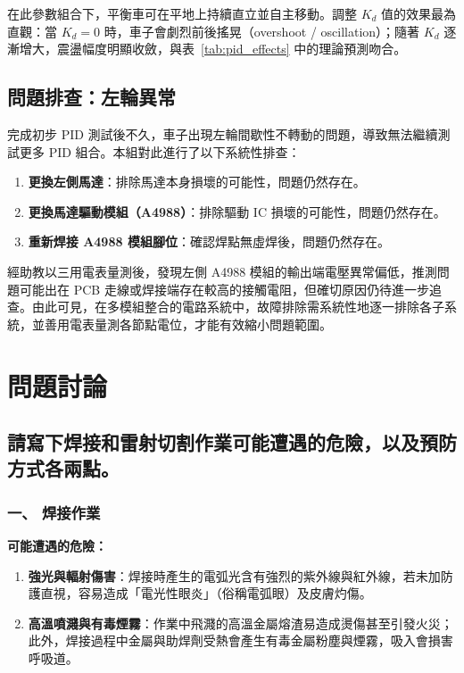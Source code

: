 \documentclass[12pt]{article}
\begin{document}
在此參數組合下，平衡車可在平地上持續直立並自主移動。調整 $K_d$ 值的效果最為直觀：當 $K_d = 0$ 時，車子會劇烈前後搖晃（overshoot / oscillation）；隨著 $K_d$ 逐漸增大，震盪幅度明顯收斂，與表~\ref{tab:pid_effects} 中的理論預測吻合。

\subsection{問題排查：左輪異常}

完成初步 PID 測試後不久，車子出現左輪間歇性不轉動的問題，導致無法繼續測試更多 PID 組合。本組對此進行了以下系統性排查：

\begin{enumerate}
    \item \textbf{更換左側馬達}：排除馬達本身損壞的可能性，問題仍然存在。
    \item \textbf{更換馬達驅動模組（A4988）}：排除驅動 IC 損壞的可能性，問題仍然存在。
    \item \textbf{重新焊接 A4988 模組腳位}：確認焊點無虛焊後，問題仍然存在。
\end{enumerate}

經助教以三用電表量測後，發現左側 A4988 模組的輸出端電壓異常偏低，推測問題可能出在 PCB 走線或焊接端存在較高的接觸電阻，但確切原因仍待進一步追查。由此可見，在多模組整合的電路系統中，故障排除需系統性地逐一排除各子系統，並善用電表量測各節點電位，才能有效縮小問題範圍。


\section{問題討論}


\subsection{請寫下焊接和雷射切割作業可能遭遇的危險，以及預防方式各兩點。}

\subsubsection*{一、 焊接作業}
\textbf{可能遭遇的危險：}
\begin{enumerate}
    \item \textbf{強光與輻射傷害}：焊接時產生的電弧光含有強烈的紫外線與紅外線，若未加防護直視，容易造成「電光性眼炎」（俗稱電弧眼）及皮膚灼傷。
    \item \textbf{高溫噴濺與有毒煙霧}：作業中飛濺的高溫金屬熔渣易造成燙傷甚至引發火災；此外，焊接過程中金屬與助焊劑受熱會產生有毒金屬粉塵與煙霧，吸入會損害呼吸道。
\end{enumerate}
\end{document}
